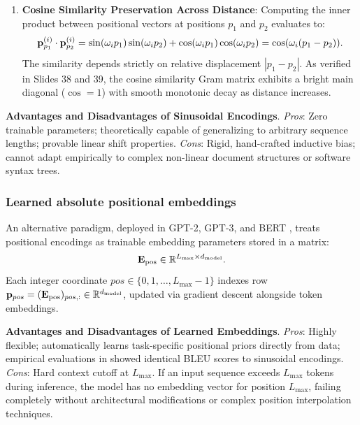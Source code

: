 \documentclass[../../../main.tex]{subfiles}
\begin{document}
\begin{enumerate}
\begin{proof}
    \end{proof}
    \item \textbf{Cosine Similarity Preservation Across Distance}: Computing the inner product between positional vectors at positions $p_1$ and $p_2$ evaluates to:
    \begin{equation}
    \mathbf{p}_{p_1}^{(i)} \cdot \mathbf{p}_{p_2}^{(i)} = \sin(\omega_i p_1)\sin(\omega_i p_2) + \cos(\omega_i p_1)\cos(\omega_i p_2) = \cos(\omega_i (p_1 - p_2)).
    \end{equation}
    The similarity depends strictly on relative displacement $|p_1 - p_2|$. As verified in Slides 38 and 39, the cosine similarity Gram matrix exhibits a bright main diagonal ($\cos = 1$) with smooth monotonic decay as distance increases.
\end{enumerate}

\noindent\textbf{Advantages and Disadvantages of Sinusoidal Encodings}.\newline
\emph{Pros}: Zero trainable parameters; theoretically capable of generalizing to arbitrary sequence lengths; provable linear shift properties.\newline
\emph{Cons}: Rigid, hand-crafted inductive bias; cannot adapt empirically to complex non-linear document structures or software syntax trees.

\subsubsection{Learned absolute positional embeddings}
An alternative paradigm, deployed in GPT-2, GPT-3, and BERT \cite{radford2019, brown2020, devlin2019}, treats positional encodings as trainable embedding parameters stored in a matrix:
\begin{equation}
\label{eq:learned_pos_embeddings}
\mathbf{E}_{\text{pos}} \in \mathbb{R}^{L_{\max} \times d_{\text{model}}}.
\end{equation}
Each integer coordinate $pos \in \{0, 1, \dots, L_{\max}-1\}$ indexes row $\mathbf{p}_{pos} = (\mathbf{E}_{\text{pos}})_{pos, :} \in \mathbb{R}^{d_{\text{model}}}$, updated via gradient descent alongside token embeddings.

\noindent\textbf{Advantages and Disadvantages of Learned Embeddings}.\newline
\emph{Pros}: Highly flexible; automatically learns task-specific positional priors directly from data; empirical evaluations in \cite{vaswani2017} showed identical BLEU scores to sinusoidal encodings.\newline
\emph{Cons}: Hard context cutoff at $L_{\max}$. If an input sequence exceeds $L_{\max}$ tokens during inference, the model has no embedding vector for position $L_{\max}$, failing completely without architectural modifications or complex position interpolation techniques.
\end{document}
